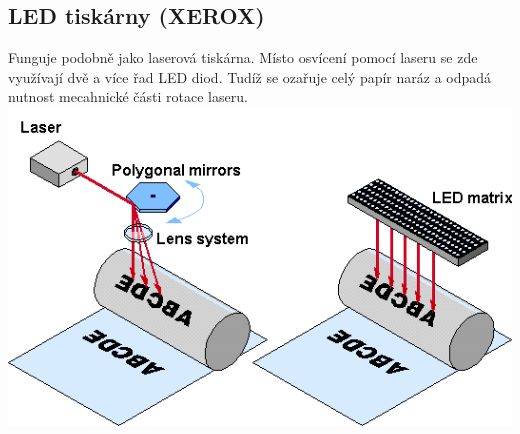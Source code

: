 \subsection{LED tiskárny (XEROX)}
Funguje podobně jako laserová tiskárna.
Místo osvícení pomocí laseru se zde využívají dvě a více řad LED diod.
Tudíž se ozařuje celý papír naráz a odpadá nutnost mecahnické části rotace laseru.\\
\includegraphics[width=1\linewidth]{TVY-POS/Laserové a LED tiskárny/LEDandLaserPrinter.png}